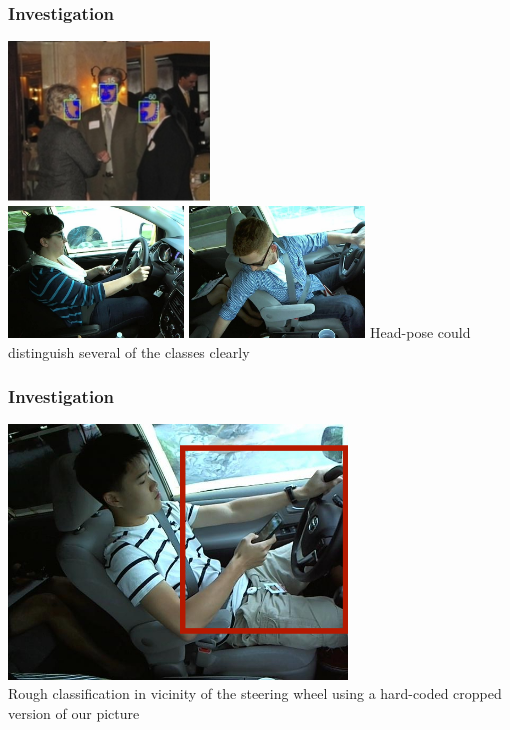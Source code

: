 \documentclass{beamer}
\begin{document}
    \begin{frame}
		\frametitle{Investigation}
        \begin{center}
	        \includegraphics[width=0.4\textwidth]{head-pose} \\ \vspace{0.1cm}
	        \includegraphics[width=0.35\textwidth]{img_5} \hspace{0.1cm}
	        \includegraphics[width=0.35\textwidth]{img_81}
			\newline
			Head-pose could distinguish several of the classes clearly
        \end{center}
    \end{frame}

    \begin{frame}
		\frametitle{Investigation}
        \begin{center}
        \includegraphics[width=9cm]{images/HandLocalisation.jpg}\\
        Rough classification in vicinity of the steering wheel using a hard-coded cropped version of our picture\end{center}
    \end{frame}
\end{document}
